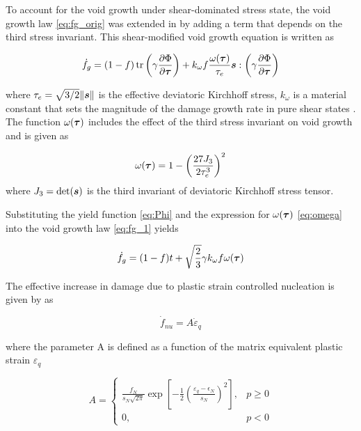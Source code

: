 To account for the void growth under shear-dominated stress state, the
void growth law \eqref{eq:fg_orig} was extended in \cite{Nahshon2008}
by adding a term that depends on the third stress invariant. This
shear-modified void growth equation is written as

\begin{equation}\label{eq:fg_1}
\dot{f}_g = (1-f)\operatorname{\text{tr}}\left( \gamma\frac{\partial\Phi}{\partial{\boldsymbol{\tau}}}
\right) + k_{\omega}f\frac{\omega({\boldsymbol{\tau}})}{\tau_e}{\boldsymbol{s}}: \left(
\gamma\frac{\partial\Phi}{\partial{\boldsymbol{\tau}}} \right)
\end{equation}

where $\tau_e=\sqrt{3/2}\|{\boldsymbol{s}}\|$ is the effective deviatoric Kirchhoff
stress, $k_{\omega}$ is a material constant that sets the magnitude of
the damage growth rate in pure shear states \cite{Nahshon2008}. The
function $\omega({\boldsymbol{\tau}})$ includes the effect of the third stress
invariant on void growth and is given as

\begin{equation}\label{eq:omega}
\omega({\boldsymbol{\tau}}) = 1- \left(\frac{27J_3}{2\tau_e^3}\right)^2
\end{equation}
where $J_3=\det({\boldsymbol{s}})$ is the third invariant of deviatoric Kirchhoff
stress tensor.

Substituting the yield function \eqref{eq:Phi} and the expression for
$\omega({\boldsymbol{\tau}})$ \eqref{eq:omega} into the void growth law
\eqref{eq:fg_1} yields

\begin{equation}\label{eq:fg_final}
\dot{f}_g = (1-f)t + \sqrt{\frac{2}{3}}\gamma k_{\omega}f
\omega({\boldsymbol{\tau}})
\end{equation}

The effective increase in damage due to plastic strain controlled
nucleation is given by \cite{Chu1980} as

\begin{equation}\label{eq:dotf_nu}
\dot{f}_{nu} = A \dot{\varepsilon}_q
\end{equation}

where the parameter A is defined as a function of the matrix
equivalent plastic strain $\varepsilon_q$

\begin{equation}
A =
   \begin{cases}
     \frac{f_N}{s_N\sqrt{2\pi}}\exp\left[ -\frac{1}{2}\left(
       \frac{\varepsilon_q - \epsilon_N}{s_N}\right)^2\right], & p
     \geq 0\\ 0, & p <0
	\end{cases}
\end{equation}

